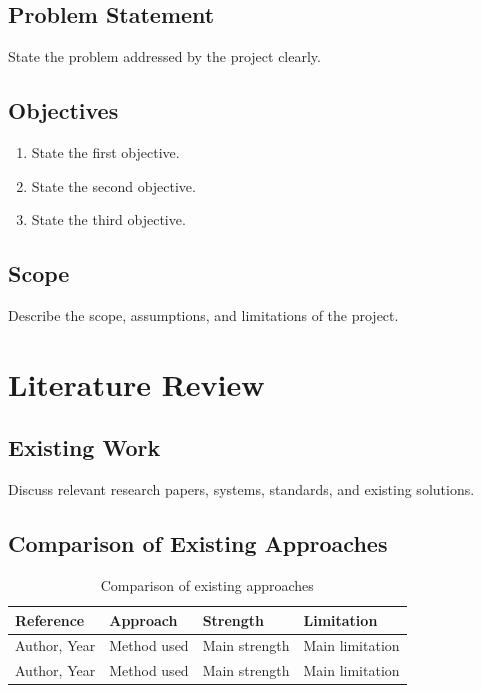 \documentclass[12pt,a4paper]{report}
\begin{document}
\section{Problem Statement}
State the problem addressed by the project clearly.

\section{Objectives}
\begin{enumerate}
    \item State the first objective.
    \item State the second objective.
    \item State the third objective.
\end{enumerate}

\section{Scope}
Describe the scope, assumptions, and limitations of the project.

\chapter{Literature Review}

\section{Existing Work}
Discuss relevant research papers, systems, standards, and existing solutions.

\section{Comparison of Existing Approaches}

\begin{table}[h]
\centering
\caption{Comparison of existing approaches}
\begin{tabular}{@{}p{3cm}p{4cm}p{3cm}p{3cm}@{}}
\toprule
\textbf{Reference} & \textbf{Approach} & \textbf{Strength} &
\textbf{Limitation}\\
\midrule
Author, Year & Method used & Main strength & Main limitation\\
Author, Year & Method used & Main strength & Main limitation\\
\bottomrule
\end{tabular}
\end{table}
\end{document}
